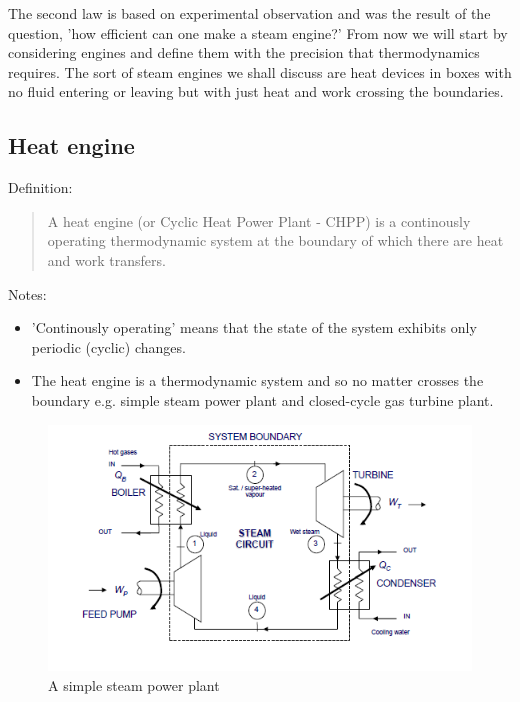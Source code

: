 \documentclass[class=report, crop=false, 12pt,a4paper]{standalone}
\begin{document}
The second law is based on experimental observation and was the result of the question, 'how efficient can one make a steam engine?' From now we will start by considering engines and define them with the precision that thermodynamics requires. The sort of steam engines we shall discuss are heat devices in boxes with no fluid entering or leaving but with just heat and work crossing the boundaries.
\subsection{Heat engine}
Definition:
\begin{quote}
  \begin{center}
    A heat engine (or Cyclic Heat Power Plant - CHPP) is a continously operating thermodynamic system at the boundary of which there are heat and work transfers.
  \end{center}
\end{quote}
Notes:
\begin{itemize}[noitemsep]
  \item 'Continously operating' means that the state of the system exhibits only periodic (cyclic) changes.
  \item The heat engine is a thermodynamic system and so no matter crosses the boundary e.g. simple steam power plant and closed-cycle gas turbine plant.
\end{itemize}
\newpage
\begin{figure}[H]
  \begin{center}
    \includegraphics[width = \textwidth]{../img/SimpleSteamPP}
    \caption{A simple steam power plant}
  \end{center}
\end{figure}
\end{document}
